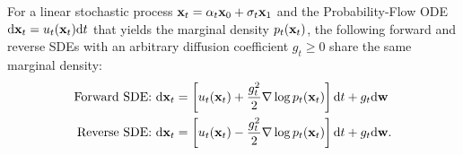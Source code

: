 \begin{proposition}


For a linear stochastic process $ \mathbf{x}_t = \alpha_t \mathbf{x}_0 + \sigma_t \mathbf{x}_1 $ and the Probability-Flow ODE $ \mathrm{d} \mathbf{x}_t = u_t(\mathbf{x}_t) \mathrm{d} t $ that yields the marginal density $p_t(\mathbf{x}_t)$, the following forward and reverse SDEs with an arbitrary diffusion coefficient $g_t \geq 0$ share the same marginal density:
\begin{align}
    \label{eq:appx_forward_sde}
    \text{Forward SDE: }\mathrm{d} \mathbf{x}_t&=\left[u_t(\mathbf{x}_t) + \frac{g_t^2}{2}\nabla\log p_t(\mathbf{x}_t)\right] \mathrm{d} t+g_t \mathrm{d} \mathbf{w}\\
    \label{eq:appx_reverse_sde}
    \text{Reverse SDE: }\mathrm{d} \mathbf{x}_t&=\left[u_t(\mathbf{x}_t) - \frac{g_t^2}{2}\nabla\log p_t(\mathbf{x}_t)\right] \mathrm{d} t+g_t \mathrm{d} \mathbf{w}.
\end{align}

\end{proposition}

